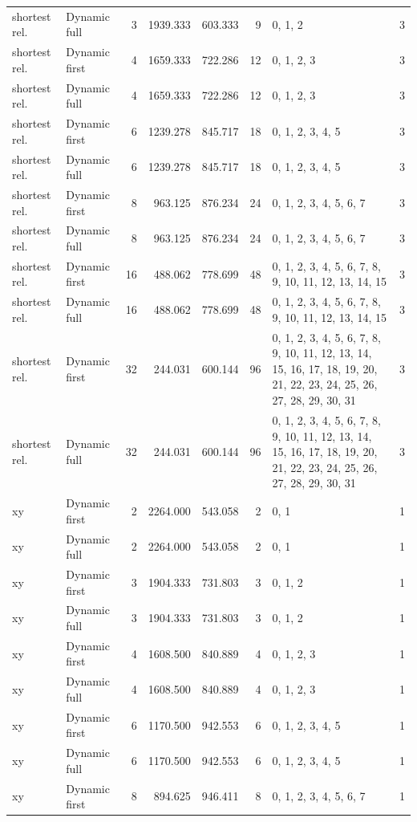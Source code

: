 \documentclass[10pt,a4paper]{article}
\begin{document}
\begin{longtable}{@{}p{23mm}p{29mm}rrrrp{36mm}r@{}}
shortest rel. & Dynamic full & 3 & 1939.333 & 603.333 & 9 & 0, 1, 2 & 3 \\
shortest rel. & Dynamic first & 4 & 1659.333 & 722.286 & 12 & 0, 1, 2, 3 & 3 \\
shortest rel. & Dynamic full & 4 & 1659.333 & 722.286 & 12 & 0, 1, 2, 3 & 3 \\
shortest rel. & Dynamic first & 6 & 1239.278 & 845.717 & 18 & 0, 1, 2, 3, 4, 5 & 3 \\
shortest rel. & Dynamic full & 6 & 1239.278 & 845.717 & 18 & 0, 1, 2, 3, 4, 5 & 3 \\
shortest rel. & Dynamic first & 8 & 963.125 & 876.234 & 24 & 0, 1, 2, 3, 4, 5, 6, 7 & 3 \\
shortest rel. & Dynamic full & 8 & 963.125 & 876.234 & 24 & 0, 1, 2, 3, 4, 5, 6, 7 & 3 \\
shortest rel. & Dynamic first & 16 & 488.062 & 778.699 & 48 & 0, 1, 2, 3, 4, 5, 6, 7, 8, 9, 10, 11, 12, 13, 14, 15 & 3 \\
shortest rel. & Dynamic full & 16 & 488.062 & 778.699 & 48 & 0, 1, 2, 3, 4, 5, 6, 7, 8, 9, 10, 11, 12, 13, 14, 15 & 3 \\
shortest rel. & Dynamic first & 32 & 244.031 & 600.144 & 96 & 0, 1, 2, 3, 4, 5, 6, 7, 8, 9, 10, 11, 12, 13, 14, 15, 16, 17, 18, 19, 20, 21, 22, 23, 24, 25, 26, 27, 28, 29, 30, 31 & 3 \\
shortest rel. & Dynamic full & 32 & 244.031 & 600.144 & 96 & 0, 1, 2, 3, 4, 5, 6, 7, 8, 9, 10, 11, 12, 13, 14, 15, 16, 17, 18, 19, 20, 21, 22, 23, 24, 25, 26, 27, 28, 29, 30, 31 & 3 \\
xy & Dynamic first & 2 & 2264.000 & 543.058 & 2 & 0, 1 & 1 \\
xy & Dynamic full & 2 & 2264.000 & 543.058 & 2 & 0, 1 & 1 \\
xy & Dynamic first & 3 & 1904.333 & 731.803 & 3 & 0, 1, 2 & 1 \\
xy & Dynamic full & 3 & 1904.333 & 731.803 & 3 & 0, 1, 2 & 1 \\
xy & Dynamic first & 4 & 1608.500 & 840.889 & 4 & 0, 1, 2, 3 & 1 \\
xy & Dynamic full & 4 & 1608.500 & 840.889 & 4 & 0, 1, 2, 3 & 1 \\
xy & Dynamic first & 6 & 1170.500 & 942.553 & 6 & 0, 1, 2, 3, 4, 5 & 1 \\
xy & Dynamic full & 6 & 1170.500 & 942.553 & 6 & 0, 1, 2, 3, 4, 5 & 1 \\
xy & Dynamic first & 8 & 894.625 & 946.411 & 8 & 0, 1, 2, 3, 4, 5, 6, 7 & 1 \\

\end{longtable}
\end{document}
